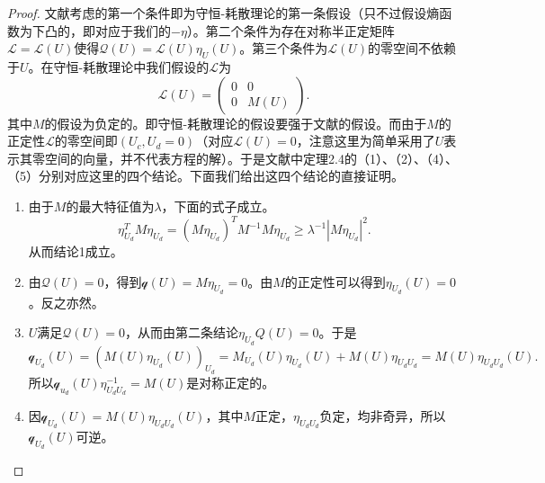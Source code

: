 \documentclass{article}
\begin{document}
	\begin{proof}
		文献\cite{}考虑的第一个条件即为守恒-耗散理论的第一条假设（只不过\cite{}假设熵函数为下凸的，即对应于我们的$-\eta$）。第二个条件为存在对称半正定矩阵$\mathcal{L} = \mathcal{L}(U)$使得$\mathcal{Q}(U) = \mathcal{L}(U) \eta_{U} (U)$。第三个条件为$\mathcal{L}(U)$的零空间不依赖于$U$。在守恒-耗散理论中我们假设的$\mathcal{L}$为
		\begin{equation*}
			\mathcal{L} (U)= \left( \begin{array}{cc}
			0 & 0 \\ 0 & M(U)
			\end{array} \right).
		\end{equation*}
		其中$M$的假设为负定的。即守恒-耗散理论的假设要强于文献\cite{}的假设。而由于$M$的正定性$\mathcal{L}$的零空间即$(U_c,U_d = 0)$（对应$\mathcal{L}(U) = 0$，注意这里为简单采用了$U$表示其零空间的向量，并不代表方程的解）。于是文献\cite{}中定理2.4的（1）、（2）、（4）、（5）分别对应这里的四个结论。下面我们给出这四个结论的直接证明。
		\begin{enumerate}
			\item 由于$M$的最大特征值为$\lambda$，下面的式子成立。
			\begin{equation*}
				\eta_{U_d}^T M \eta_{U_d} = (M \eta_{U_d})^T M^{-1} M \eta_{U_d}  \ge \lambda^{-1} | M\eta_{U_d}|^2. 
			\end{equation*}
			从而结论1成立。
			\item 由$\mathcal{Q}(U) = 0$，得到$ \mathcal{q}(U) = M\eta_{U_d} = 0$。由$M$的正定性可以得到$\eta_{U_d}(U) = 0$。反之亦然。
			\item $U$满足$\mathcal{Q}(U) = 0$，从而由第二条结论$\eta_{U_d}{Q}(U) = 0$。于是
			\begin{equation*}
				\mathcal{q}_{U_d} (U) = (M(U) \eta_{U_d}(U))_{U_d} = M_{U_{d}}(U)\eta_{U_d}(U) +M(U) \eta_{U_d U_d} = M(U) \eta_{U_d U_d}(U).  
			\end{equation*}
			所以$\mathcal{q}_{u_d}(U) \eta_{U_d U_d}^{-1} = M(U)$是对称正定的。
			\item 因$\mathcal{q}_{U_d} (U) = M(U) \eta_{U_d U_d}(U)$，其中$M$正定，$\eta_{U_d U_d}$负定，均非奇异，所以$\mathcal{q}_{U_d} (U)$可逆。
			\end{enumerate}
	\end{proof}
\end{document}
